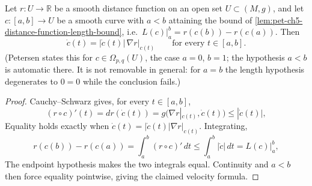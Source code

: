 \begin{remark}
  \label{rem:pet-ch5-distance-function-rigidity}
  \leanok
  Let $r:U\to\mathbb R$ be a smooth distance function on an open set
  $U\subset(M,g)$, and let $c:[a,b]\to U$ be a smooth curve with $a<b$ attaining
  the bound of \cref{lem:pet-ch5-distance-function-length-bound}, i.e.\
  $L(c)|_a^b=r(c(b))-r(c(a))$. Then
  \[
    \dot c(t)=|\dot c(t)|\,\nabla r|_{c(t)}\qquad\text{for every }t\in[a,b].
  \]
  (Petersen states this for $c\in\Omega_{p,q}(U)$, the case $a=0$, $b=1$; the
  hypothesis $a<b$ is automatic there. It is not removable in general: for $a=b$
  the length hypothesis degenerates to $0=0$ while the conclusion fails.)
\end{remark}
\begin{proof}
  \leanok
  \sketch
  Cauchy--Schwarz gives, for every $t\in[a,b]$,
  \[
    (r\circ c)'(t)=dr(\dot c(t))=g(\nabla r|_{c(t)},\dot c(t))\le|\dot c(t)|,
  \]
  Equality holds exactly when $\dot c(t)=|\dot c(t)|\nabla r|_{c(t)}$. Integrating,
  \[
    r(c(b))-r(c(a))=\int_a^b(r\circ c)'\,dt\le\int_a^b|\dot c|\,dt=L(c)|_a^b,
  \]
  The endpoint hypothesis makes the two integrals equal.  Continuity and $a<b$
  then force equality pointwise, giving the claimed velocity formula.
\end{proof}

